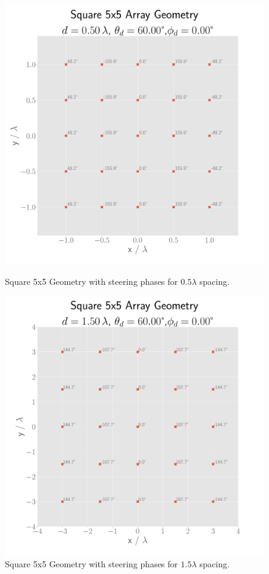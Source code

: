 
\begin{figure}[H]
  \begin{minipage}[t]{0.45\textwidth}
    \centering
    \includegraphics[width=\textwidth]{graphics/task_2/square-0.50-lambda-60.00-theta-0.00-phi-geometry.pdf}
    \caption{Square 5x5 Geometry with steering phases for $0.5\lambda$ spacing.}\label{fig:phase1}
  \end{minipage}\hfill
  \begin{minipage}[t]{0.45\textwidth}
    \centering
    \includegraphics[width=\textwidth]{graphics/task_2/square-1.50-lambda-60.00-theta-0.00-phi-geometry.pdf}
    \caption{Square 5x5 Geometry with steering phases for $1.5\lambda$ spacing.}\label{fig:phase2}
   \end{minipage}
\end{figure}


